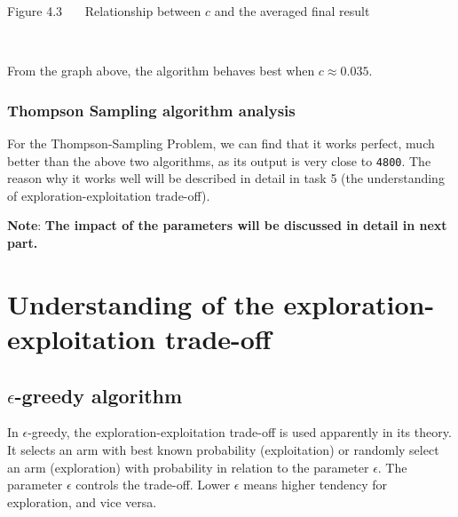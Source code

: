 \documentclass[11pt]{article}
\begin{document}
\pagebreak
    \begin{center}

    \begin{small}
        Figure 4.3 \ \ \  Relationship between $c$ and the averaged final result
    \end{small}

    \end{center}
    { \hspace*{\fill} \\}
    
    From the graph above, the algorithm behaves best when
\(c\approx 0.035\).

    \hypertarget{thompson-sampling-algorithm-analysis}{%
\subsubsection{Thompson Sampling algorithm
analysis}\label{thompson-sampling-algorithm-analysis}}

For the Thompson-Sampling Problem, we can find that it works perfect,
much better than the above two algorithms, as its output is very close
to \texttt{4800}. The reason why it works well will be described in
detail in task 5 (the understanding of exploration-exploitation
trade-off).

\textbf{Note}:  \textbf{The impact of the parameters will be discussed in detail in next part.}

\pagebreak
    \hypertarget{understanding-of-the-exploration-exploitation-trade-off.}{%
\section{Understanding of the exploration-exploitation
trade-off}\label{understanding-of-the-exploration-exploitation-trade-off.}}

\hypertarget{epsilon-greedy-algorithm}{%
\subsection{\texorpdfstring{\(\epsilon\)-greedy
algorithm}{\textbackslash epsilon-greedy algorithm}}\label{epsilon-greedy-algorithm}}

In \(\epsilon\)-greedy, the exploration-exploitation trade-off is used
apparently in its theory. It selects an arm with best known probability
(exploitation) or randomly select an arm (exploration) with probability
in relation to the parameter \(\epsilon\). The parameter \(\epsilon\)
controls the trade-off. Lower \(\epsilon\) means higher tendency for
exploration, and vice versa.
\end{document}
